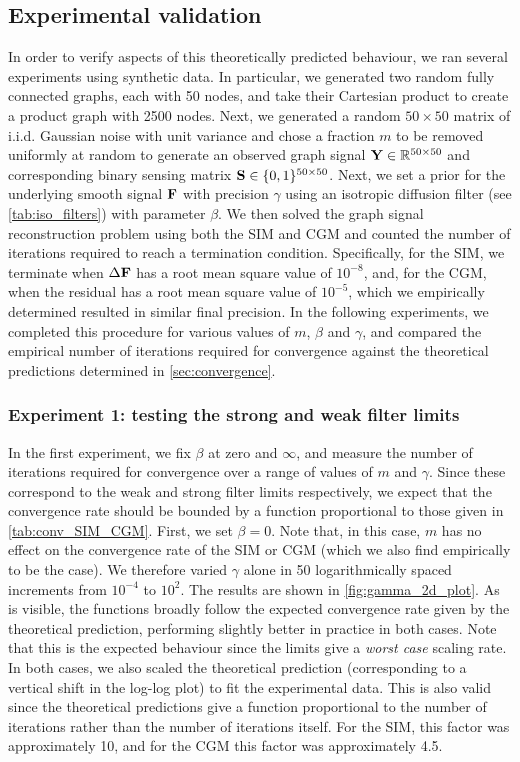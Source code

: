 \subsection{Experimental validation}

In order to verify aspects of this theoretically predicted behaviour, we ran several experiments using synthetic data. In particular, we generated two random fully connected graphs, each with 50 nodes, and take their Cartesian product to create a product graph with 2500 nodes. Next, we generated a random $50 \times 50$ matrix of i.i.d. Gaussian noise with unit variance and chose a fraction $m$ to be removed uniformly at random to generate an observed graph signal $\mathbf{Y} \in \mathbb{R}^{50 \times 50}$ and corresponding binary sensing matrix $\mathbf{S} \in \{0, 1\}^{50 \times 50}$. Next, we set a prior for the underlying smooth signal $\mathbf{F}$ with precision $\gamma$ using an isotropic diffusion filter (see \cref{tab:iso_filters}) with parameter $\beta$. We then solved the graph signal reconstruction problem using both the SIM and CGM and counted the number of iterations required to reach a termination condition. Specifically, for the SIM, we terminate when $\Delta\mathbf{F}$ has a root mean square value of $10^{-8}$, and, for the CGM, when the residual has a root mean square value of $10^{-5}$, which we empirically determined resulted in similar final precision. In the following experiments, we completed this procedure for various values of $m$, $\beta$ and $\gamma$, and compared the empirical number of iterations required for convergence against the theoretical predictions determined in \cref{sec:convergence}. 
 
\subsubsection{Experiment 1: testing the strong and weak filter limits}

In the first experiment, we fix $\beta$ at zero and $\infty$, and measure the number of iterations required for convergence over a range of values of $m$ and $\gamma$. Since these correspond to the weak and strong filter limits respectively, we expect that the convergence rate should be bounded by a function proportional to those given in \cref{tab:conv_SIM_CGM}. First, we set $\beta=0$. Note that, in this case, $m$ has no effect on the convergence rate of the SIM or CGM (which we also find empirically to be the case). We therefore varied $\gamma$ alone in 50 logarithmically spaced increments from $10^{-4}$ to $10^2$. The results are shown in \cref{fig:gamma_2d_plot}. As is visible, the functions broadly follow the expected convergence rate given by the theoretical prediction, performing slightly better in practice in both cases. Note that this is the expected behaviour since the limits give a \textit{worst case} scaling rate. In both cases, we also scaled the theoretical prediction (corresponding to a vertical shift in the log-log plot) to fit the experimental data. This is also valid since the theoretical predictions give a function proportional to the number of iterations rather than the number of iterations itself. For the SIM, this factor was approximately 10, and for the CGM this factor was approximately 4.5. 
 

